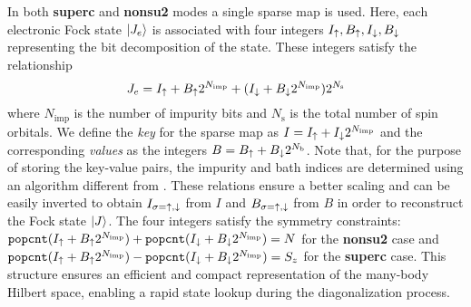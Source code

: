 \documentclass[edipack_sp.tex]{subfiles}
\begin{document}
In both {\bf superc} and {\bf nonsu2} modes a single sparse map is
used.
Here, each electronic Fock state $|J_e\rangle$ is associated with four integers $I_\uparrow, B_\uparrow, I_\downarrow,
B_\downarrow$ representing the bit decomposition of the state. 
These integers satisfy the relationship
\begin{equation}\label{spMapEq1}
J_e =I_\uparrow +  B_\uparrow2^{N_\mathrm{imp}} + (I_\downarrow +  B_\downarrow2^{N_\mathrm{imp}})2^{N_\mathrm{s}}
\end{equation}
where $N_\mathrm{imp}$ is the number of impurity bits and 
$N_\mathrm{s}$ is the total number of spin orbitals.
We define the \emph{key} for the sparse
map as $I=I_\uparrow + I_\downarrow2^{N_\mathrm{imp}}$ and the corresponding
\emph{values} as the integers $B=B_\uparrow + B_\downarrow2^{N_\mathrm{b}}$.
Note that, for the purpose of storing the key-value pairs, the impurity and bath indices are determined using an algorithm different from .   
These relations ensure a better scaling and can be easily inverted to obtain $I_{\sigma=\uparrow,\downarrow}$ from
$I$ and $B_{\sigma=\uparrow,\downarrow}$ from $B$ in order to reconstruct the Fock
state $|J\rangle$.
The four integers satisfy the symmetry constraints:   
$\mathtt{popcnt}(I_\uparrow + B_\uparrow2^{N_\mathrm{imp}}) + \mathtt{popcnt}(I_\downarrow + B_\downarrow2^{N_\mathrm{imp}}) = N$
for the \textbf{nonsu2} case and
$\mathtt{popcnt}(I_\uparrow + B_\uparrow2^{N_\mathrm{imp}}) - \mathtt{popcnt}(I_\downarrow + B_\downarrow2^{N_\mathrm{imp}}) = S_z$
for the \textbf{superc} case.
This structure ensures an efficient and compact representation 
of the many-body Hilbert space, enabling a rapid state lookup 
during the diagonalization process.
\end{document}
